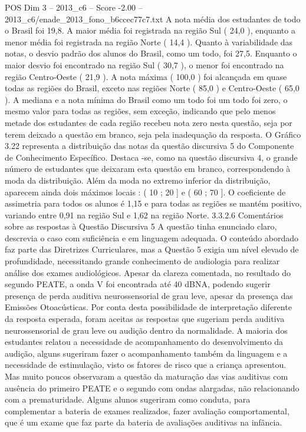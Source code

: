 \begin{textsample}{POS Dim 3 – 2013\_c6 – Score -2.00 – 2013\_c6/enade\_2013\_fono\_b6ccec77c7.txt}
A nota média dos estudantes de todo o Brasil foi 19,8.
A maior média foi registrada na região Sul ( 24,0 ), enquanto a menor média foi registrada na região Norte ( 14,4 ).
Quanto à variabilidade das notas, o desvio padrão dos alunos do Brasil, como um todo, foi 27,5.
Enquanto o maior desvio foi encontrado na região Sul ( 30,7 ), o menor foi encontrado na região Centro-Oeste ( 21,9 ).
A nota máxima ( 100,0 ) foi alcançada em quase todas as regiões do Brasil, exceto nas regiões Norte ( 85,0 ) e Centro-Oeste ( 65,0 ).
A mediana e a nota mínima do Brasil como um todo foi um todo foi zero, o mesmo valor para todas as regiões, sem exceção, indicando que pelo menos metade dos estudantes de cada região recebeu nota zero nesta questão, seja por terem deixado a questão em branco, seja pela inadequação da resposta.
O Gráfico 3.22 representa a distribuição das notas da questão discursiva 5 do Componente de Conhecimento Específico.
Destaca -se, como na questão discursiva 4, o grande número de estudantes que deixaram esta questão em branco, correspondendo à moda da distribuição.
Além da moda no extremo inferior da distribuição, aparecem ainda dois máximos locais : ( 10 ; 20 ] e ( 60 ; 70 ].
O coeficiente de assimetria para todos os alunos é 1,15 e para todas as regiões se mantém positivo, variando entre 0,91 na região Sul e 1,62 na região Norte. 3.3.2.6 Comentários sobre as respostas à Questão Discursiva 5 A questão tinha enunciado claro, descrevia o caso com suficiência e em linguagem adequada.
O conteúdo abordado faz parte das Diretrizes Curriculares, mas a Questão 5 exigia um nível elevado de profundidade, necessitando grande conhecimento de audiologia para realizar análise dos exames audiológicos.
Apesar da clareza comentada, no resultado do segundo PEATE, a onda V foi encontrada até 40 dBNA, podendo sugerir presença de perda auditiva neurossensorial de grau leve, apesar da presença das Emissões Otoacústicas.
Por conta desta possibilidade de interpretação diferente da resposta esperada, foram aceitas as respostas que sugeriam perda auditiva neurossensorial de grau leve ou audição dentro da normalidade.
A maioria dos estudantes relatou a necessidade de acompanhamento do desenvolvimento da audição, alguns sugeriram fazer o acompanhamento também da linguagem e a necessidade de estimulação, visto os fatores de risco que a criança apresentou.
Mas muito poucos observaram a questão da maturação das vias auditivas com ausência do primeiro PEATE e o segundo com ondas alargadas, não relacionando com a prematuridade.
Alguns alunos sugeriram como conduta, para complementar a bateria de exames realizados, fazer avaliação comportamental, que é um exame que faz parte da bateria de avaliações auditivas na infância.

\end{textsample}
